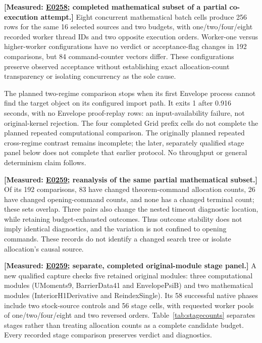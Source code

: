 \documentclass[10pt,twocolumn]{article}
\newcommand{\measured}[1]{\textbf{[Measured: #1]}}
\newcommand{\expref}[2]{\href{https://github.com/yunwei37/proofserve/blob/main/docs/tmp/build-and-evaluate/step-#1/step-report.md}{E#2}}
\begin{document}
\measured{\expref{0258-20261101T225830+0000}{0258};
completed mathematical subset of a partial co-execution attempt.}
Eight concurrent mathematical batch cells produce 256 rows for the same
16 selected sources and two budgets, with one/two/four/eight recorded worker
thread IDs and two opposite execution orders.
Worker-one versus higher-worker configurations have no verdict or
acceptance-flag changes in 192 comparisons, but 84 command-counter vectors
differ. These configurations preserve observed acceptance without
establishing exact allocation-count transparency or isolating concurrency
as the sole cause.

The planned two-regime comparison stops when its first Envelope process
cannot find the target object on its configured import path.
It exits 1 after 0.916 seconds, with no Envelope proof-replay rows:
an input-availability failure, not original-kernel rejection.
The four completed Grid prefix cells do not complete the planned repeated
computational comparison. The originally planned repeated cross-regime contrast remains incomplete;
the later, separately qualified stage panel below does not complete that
earlier protocol. No throughput or general determinism claim follows.


\measured{\expref{0259-20261102T000306+0000}{0259}; reanalysis of the same partial mathematical subset.}
Of its 192 comparisons, 83 have changed theorem-command allocation counts,
26 have changed opening-command counts, and none has a changed terminal
count; these sets overlap. Three pairs also change the nested timeout
diagnostic location, while retaining budget-exhausted outcomes.
Thus outcome stability does not imply identical diagnostics, and the
variation is not confined to opening commands. These records do not
identify a changed search tree or isolate allocation's causal source.

\measured{\expref{0259-20261102T000306+0000}{0259}; separate, completed original-module stage panel.}
A new qualified capture checks five retained original modules:
three computational modules (UMoments9, BarrierData41 and EnvelopePsiB)
and two mathematical modules (InteriorH1Derivative and ReindexSingle).
Its 58 successful native phases include two stock-source controls and
56 stage cells, with requested worker pools of one/two/four/eight and
two reversed orders. Table~\ref{tab:stagecounts} separates stages rather
than treating allocation counts as a complete candidate budget.
Every recorded stage comparison preserves verdict and diagnostics.
\end{document}
